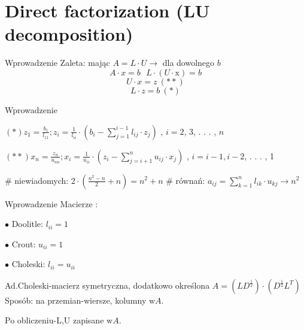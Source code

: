 \section{Direct factorization (LU decomposition)}
\begin{frame}{Wprowadzenie}
Zaleta: mając $A=L\cdot U\rightarrow $ dla dowolnego $b$
$$
A\cdot x=b\ \ \ L\cdot(U\cdot \mathrm{x})=b
$$
$$
U\cdot x=z\ (**)
$$
$$
L\cdot z=b\ (*)
$$
\end{frame}
\begin{frame}{Wprowadzenie}
\begin{center}
$(*)z_{1}=\displaystyle \frac{b_{1}}{l_{11}};z_{i}=\frac{1}{l_{ii}}\cdot(b_{i}-\sum_{j=1}^{i-1}l_{ij}\cdot z_{j})$ , $i=2$, 3, . . . , $n$
\end{center}
$(**)x_{n}=\displaystyle \frac{z_{n}}{u_{nn}};x_{i}=\frac{1}{u_{ii}}\cdot(z_{i}-\sum_{j=i+1}^{n}u_{ij}\cdot x_{j})$ , $i=i-1, i-2$, . . . , 1

\# niewiadomych: $2 \cdot \left( \frac{n^{2}-n}{2}+n\right)=n^{2}+n$ \newline
\# r\'{o}wna\'{n}: $a_{ij}=\displaystyle \sum_{k=1}^{n}l_{ik}\cdot u_{kj}\rightarrow n^{2}$
\end{frame}
\begin{frame}{Wprowadzenie}
Macierze :

$\bullet$ Doolitle: $l_{ii}=1$

$\bullet$ Crout: $u_{ii}=1$

$\bullet$ Choleski: $l_{ii}=u_{ii}$

Ad.Choleski-macierz symetryczna, dodatkowo określona $A=(LD^{\frac{1}{2}})\cdot(D^{\frac{1}{2}}L^{T})$ \newline
Sposób: na przemian-wiersze, kolumny $\mathrm{w}A.$

Po obliczeniu-L,U zapisane $\mathrm{w}A.$
\end{frame}
